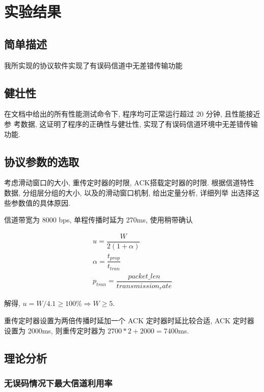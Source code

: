 \section{实验结果}

\subsection{简单描述}

我所实现的协议软件实现了有误码信道中无差错传输功能

\subsection{健壮性}

\par 在文档中给出的所有性能测试命令下, 程序均可正常运行超过 20 分钟, 且性能接近参
考数据, 这证明了程序的正确性与健壮性, 实现了有误码信道环境中无差错传输功能.

\subsection{协议参数的选取}

\par 考虑滑动窗口的大小, 重传定时器的时限, ACK搭载定时器的时限.
根据信道特性数据, 分组层分组的大小, 以及的滑动窗口机制, 给出定量分析, 详细列举
出选择这些参数值的具体原因.

\par 信道带宽为 8000 bps, 单程传播时延为 270ms, 使用稍带确认

\begin{align*}
  u = \dfrac{W}{2(1 + \alpha)}        \\
  \alpha = \dfrac{t_{prop}}{t_{tran}} \\
  p_{tran} = \dfrac{packet\_len}{transmission_rate}
\end{align*}

解得, $u = W / 4.1 \geqslant 100\% \Rightarrow W \geqslant 5$.

重传定时器设置为两倍传播时延加一个 ACK 定时器时延比较合适, ACK 定时器设置为 2000ms, 则重传定时器为 $2700 * 2 + 2000 = 7400$ms.

\subsection{理论分析}

\subsubsection{无误码情况下最大信道利用率}

